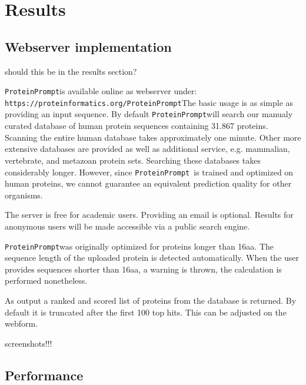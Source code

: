 \documentclass[preprint,3p,times,twocolumn]{elsarticle}
\newcommand{\TODO}[1] {\begingroup\color{red}#1\endgroup}
\newcommand{\url}[1]{\texttt{https://\small #1}}
\newcommand{\tool}{\texttt{ProteinPrompt}\hspace{2pt}}
\newcommand{\website}{\url{proteinformatics.org/\tool}}
\begin{document}

\section{Results}

\subsection{Webserver implementation}
\TODO{should this be in the results section?}

\tool is available online as webserver under: \website The basic usage
is as simple as providing an input sequence. By default \tool will
search our manualy curated database of human protein sequences
containing 31.867 proteins. Scanning the entire human database takes
approximately one minute. Other more extensive databases are provided
as well as additional service, e.g. mammalian, vertebrate, and
metazoan protein sets. Searching these databases takes considerably
longer. However, since \tool\ is trained and optimized
on human proteins, we cannot guarantee an equivalent prediction
quality for other organisms. 

The server is free for academic users. Providing an email is
optional. Results for anonymous users will be made accessible via a
public search engine. 

%

\tool was originally optimized for proteins longer than 16aa. The
sequence length of the uploaded protein is detected automatically. When the user provides
sequences shorter than 16aa, a warning is thrown,
the calculation is performed nonetheless.

As output a ranked and scored list of proteins from the database is
returned. By default it is truncated after the first 100 top
hits. This can be adjusted on the webform. 

\TODO{ screenshots!!!}

\subsection{Performance}
\label{performance}
\end{document}
